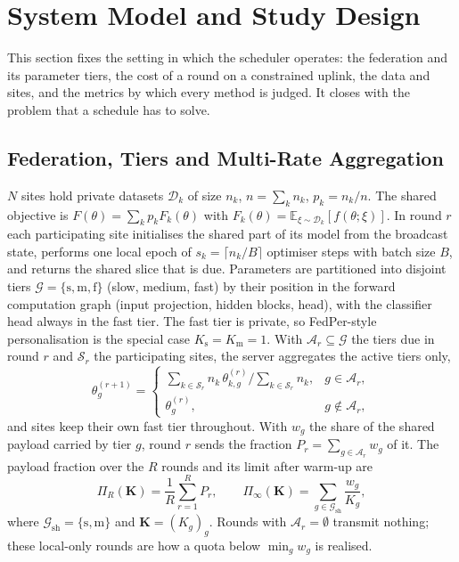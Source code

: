 \section{System Model and Study Design}
\label{sec:system}
This section fixes the setting in which the scheduler operates: the federation and its parameter tiers, the cost of a round on a constrained uplink, the data and sites, and the metrics by which every method is judged. It closes with the problem that a schedule has to solve.

\subsection{Federation, Tiers and Multi-Rate Aggregation}
$N$ sites hold private datasets $\mathcal D_k$ of size $n_k$, $n=\sum_k n_k$, $p_k=n_k/n$. The shared objective is $F(\theta)=\sum_k p_kF_k(\theta)$ with $F_k(\theta)=\mathbb E_{\xi\sim\mathcal D_k}[f(\theta;\xi)]$. In round $r$ each participating site initialises the shared part of its model from the broadcast state, performs one local epoch of $s_k=\lceil n_k/B\rceil$ optimiser steps with batch size $B$, and returns the shared slice that is due. Parameters are partitioned into disjoint tiers $\mathcal G=\{\mathrm s,\mathrm m,\mathrm f\}$ (slow, medium, fast) by their position in the forward computation graph (input projection, hidden blocks, head), with the classifier head always in the fast tier. The fast tier is private, so FedPer-style personalisation is the special case $K_{\mathrm s}=K_{\mathrm m}=1$. With $\mathcal A_r\subseteq\mathcal G$ the tiers due in round $r$ and $\mathcal S_r$ the participating sites, the server aggregates the active tiers only,
\begin{equation}
\theta_g^{(r+1)}=\begin{cases}\sum_{k\in\mathcal S_r}n_k\,\theta_{k,g}^{(r)}\big/\sum_{k\in\mathcal S_r}n_k, & g\in\mathcal A_r,\\ \theta_g^{(r)}, & g\notin\mathcal A_r,\end{cases}
\label{eq:agg}
\end{equation}
and sites keep their own fast tier throughout. With $w_g$ the share of the shared payload carried by tier $g$, round $r$ sends the fraction $P_r=\sum_{g\in\mathcal A_r}w_g$ of it. The payload fraction over the $R$ rounds and its limit after warm-up are
\begin{equation}
\Pi_R(\mathbf K)=\frac1R\sum_{r=1}^RP_r,\qquad \Pi_\infty(\mathbf K)=\sum_{g\in\mathcal G_{\mathrm{sh}}}\frac{w_g}{K_g},
\label{eq:payload}
\end{equation}
where $\mathcal G_{\mathrm{sh}}=\{\mathrm s,\mathrm m\}$ and $\mathbf K=(K_g)_g$. Rounds with $\mathcal A_r=\emptyset$ transmit nothing; these local-only rounds are how a quota below $\min_g w_g$ is realised.


